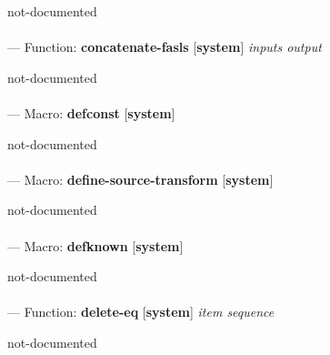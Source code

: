 \begin{adjustwidth}{5em}{5em}
not-documented
\end{adjustwidth}

\paragraph{}
\label{SYSTEM:CONCATENATE-FASLS}
--- Function: \textbf{concatenate-fasls} [\textbf{system}] \textit{inputs output}

\begin{adjustwidth}{5em}{5em}
not-documented
\end{adjustwidth}

\paragraph{}
\label{SYSTEM:DEFCONST}
--- Macro: \textbf{defconst} [\textbf{system}] \textit{}

\begin{adjustwidth}{5em}{5em}
not-documented
\end{adjustwidth}

\paragraph{}
\label{SYSTEM:DEFINE-SOURCE-TRANSFORM}
--- Macro: \textbf{define-source-transform} [\textbf{system}] \textit{}

\begin{adjustwidth}{5em}{5em}
not-documented
\end{adjustwidth}

\paragraph{}
\label{SYSTEM:DEFKNOWN}
--- Macro: \textbf{defknown} [\textbf{system}] \textit{}

\begin{adjustwidth}{5em}{5em}
not-documented
\end{adjustwidth}

\paragraph{}
\label{SYSTEM:DELETE-EQ}
--- Function: \textbf{delete-eq} [\textbf{system}] \textit{item sequence}

\begin{adjustwidth}{5em}{5em}
not-documented
\end{adjustwidth}

